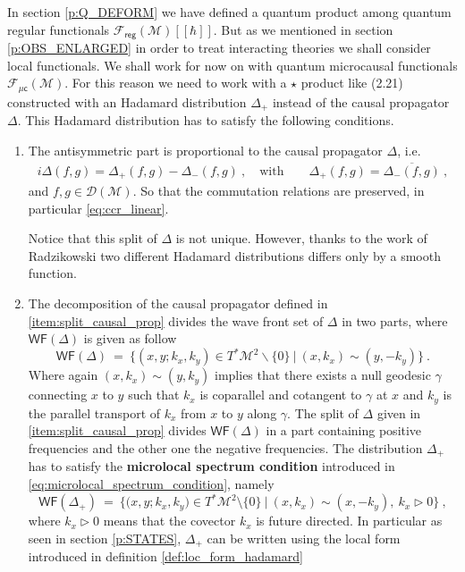 \documentclass[11pt]{book}
\newcommand{\WF}{\mathsf{WF}}
\newcommand{\reg}{\mathsf{reg}}
\newcommand{\Dcal}{\mathcal{D}}
\newcommand{\Fcal}{\mathcal{F}}
\newcommand{\Mcal}{\mathcal{M}}
\theoremstyle{break}
\begin{document}
In section \ref{p:Q_DEFORM} we have defined a quantum product among quantum regular functionals $\Fcal_\reg(\Mcal)[[\hbar]]$. But as we mentioned in section \ref{p:OBS_ENLARGED} in order to treat interacting theories we shall consider local functionals. We shall work for now on with quantum microcausal functionals $\Fcal_{\mathsf{\mu c}}(\Mcal)$. For this reason we need to work with a $\star$ product like (2.21) constructed with  an Hadamard distribution $\Delta_+$ instead of the causal propagator $\Delta$. This Hadamard distribution has to satisfy the following conditions.
%
\begin{enumerate}
\item\label{item:split_causal_prop} The antisymmetric part is proportional to the causal propagator $\Delta$, i.e. 
%
\begin{eqnarray*}
i \Delta(f,g) = \Delta_+(f,g) - \Delta_-(f,g) \ , \quad \mbox{with} \qquad \Delta_+(f,g) = \overline{\Delta_-(f,g)} \ ,
\end{eqnarray*}
%
and $f,g \in \Dcal(\Mcal)$. So that the commutation relations are preserved, in particular \eqref{eq:ccr_linear}.\par%
%
Notice that this split of $\Delta$ is not unique. However, thanks to the work of Radzikowski \cite{RADZIKOWSKI_1996} two different Hadamard distributions differs only by a smooth function. 

\item The decomposition of the causal propagator defined in \ref{item:split_causal_prop} divides the wave front set of $\Delta$ in two parts, where $\WF(\Delta)$ is given as follow
%
\begin{equation}
\WF(\Delta) \ = \ \bigg\{ \left(x,y;k_x,k_y\right) \in T^{\ast}\Mcal^{2} \backslash\{0\} \ \bigg| \ (x,k_x) \sim (y,-k_y) \bigg\} \ .
\label{eq:wf_causal_prop}
\end{equation}
%
Where again $(x,k_x) \sim (y,k_y)$ implies that there exists a null geodesic $\gamma$ connecting $x$ to $y$ such that $k_x$ is coparallel and cotangent to $\gamma$ at $x$ and $k_y$ is the parallel transport of $k_x$ from $x$ to $y$ along $\gamma$. The split of $\Delta$ given in \ref{item:split_causal_prop} divides $\WF(\Delta)$ in a part containing positive frequencies and the other one the negative frequencies. The distribution $\Delta_+$ has to satisfy the \textbf{microlocal spectrum condition} introduced in \eqref{eq:microlocal_spectrum_condition}, namely
%
\begin{equation}
\WF(\Delta_+) \ = \ \bigg\{ \bigg( x, y ; k_x, k_y \bigg) \in T^\ast\Mcal^2 \setminus \{0\} \ \bigg| \ (x,k_x) \sim (x,-k_y), \ k_x \triangleright 0 \bigg\} \ ,
\label{eq:wf_hadamard}
\end{equation}
%
where $k_x \triangleright 0$ means that the covector $k_x$ is future directed. In particular as seen in section \ref{p:STATES}, $\Delta_+$ can be written using the local form introduced in definition \ref{def:loc_form_hadamard}
\end{enumerate}
\end{document}
